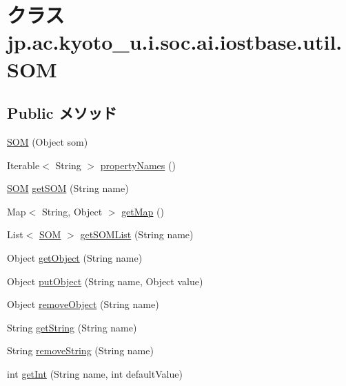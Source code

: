 \hypertarget{classjp_1_1ac_1_1kyoto__u_1_1i_1_1soc_1_1ai_1_1iostbase_1_1util_1_1_s_o_m}{\section{クラス jp.\-ac.\-kyoto\-\_\-u.\-i.\-soc.\-ai.\-iostbase.\-util.\-S\-O\-M}
\label{classjp_1_1ac_1_1kyoto__u_1_1i_1_1soc_1_1ai_1_1iostbase_1_1util_1_1_s_o_m}
}
\subsection*{Public メソッド}
\begin{DoxyCompactItemize}
\item 
\hyperlink{classjp_1_1ac_1_1kyoto__u_1_1i_1_1soc_1_1ai_1_1iostbase_1_1util_1_1_s_o_m_a729d87cf18ea83e7769f395468f86bc6}{S\-O\-M} (Object som)
\item 
Iterable$<$ String $>$ \hyperlink{classjp_1_1ac_1_1kyoto__u_1_1i_1_1soc_1_1ai_1_1iostbase_1_1util_1_1_s_o_m_adea2211bede7ee7b0fe434d510657f39}{property\-Names} ()
\item 
\hyperlink{classjp_1_1ac_1_1kyoto__u_1_1i_1_1soc_1_1ai_1_1iostbase_1_1util_1_1_s_o_m}{S\-O\-M} \hyperlink{classjp_1_1ac_1_1kyoto__u_1_1i_1_1soc_1_1ai_1_1iostbase_1_1util_1_1_s_o_m_ae6824be861f5d408154cb80438dc5212}{get\-S\-O\-M} (String name)
\item 
Map$<$ String, Object $>$ \hyperlink{classjp_1_1ac_1_1kyoto__u_1_1i_1_1soc_1_1ai_1_1iostbase_1_1util_1_1_s_o_m_acd1e140ba4ad34b466b648567840a3b7}{get\-Map} ()
\item 
List$<$ \hyperlink{classjp_1_1ac_1_1kyoto__u_1_1i_1_1soc_1_1ai_1_1iostbase_1_1util_1_1_s_o_m}{S\-O\-M} $>$ \hyperlink{classjp_1_1ac_1_1kyoto__u_1_1i_1_1soc_1_1ai_1_1iostbase_1_1util_1_1_s_o_m_a3423c860c488261ae9bc8f37d666f775}{get\-S\-O\-M\-List} (String name)
\item 
Object \hyperlink{classjp_1_1ac_1_1kyoto__u_1_1i_1_1soc_1_1ai_1_1iostbase_1_1util_1_1_s_o_m_ad37441cf5c05da7d1dc514241eafcac6}{get\-Object} (String name)
\item 
Object \hyperlink{classjp_1_1ac_1_1kyoto__u_1_1i_1_1soc_1_1ai_1_1iostbase_1_1util_1_1_s_o_m_a8fa572b748ecaaa0c35b772fc0ec9a6b}{put\-Object} (String name, Object value)
\item 
Object \hyperlink{classjp_1_1ac_1_1kyoto__u_1_1i_1_1soc_1_1ai_1_1iostbase_1_1util_1_1_s_o_m_a5aaad7227dde59ea22b739636bf17786}{remove\-Object} (String name)
\item 
String \hyperlink{classjp_1_1ac_1_1kyoto__u_1_1i_1_1soc_1_1ai_1_1iostbase_1_1util_1_1_s_o_m_a50cd7d862c4389cf99e9e4c5d10013cc}{get\-String} (String name)
\item 
String \hyperlink{classjp_1_1ac_1_1kyoto__u_1_1i_1_1soc_1_1ai_1_1iostbase_1_1util_1_1_s_o_m_a56b029e86eb59870fc20e98f731097fe}{remove\-String} (String name)
\item 
int \hyperlink{classjp_1_1ac_1_1kyoto__u_1_1i_1_1soc_1_1ai_1_1iostbase_1_1util_1_1_s_o_m_a7ae268d78de9c1a2b6bb919bd5f44797}{get\-Int} (String name, int default\-Value)
\end{DoxyCompactItemize}
